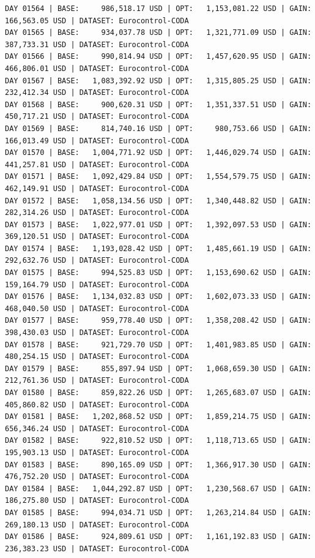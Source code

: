 \documentclass[11pt,a4paper]{article}
\begin{document}
\begin{verbatim}
DAY 01564 | BASE:     986,518.17 USD | OPT:   1,153,081.22 USD | GAIN: 166,563.05 USD | DATASET: Eurocontrol-CODA
DAY 01565 | BASE:     934,037.78 USD | OPT:   1,321,771.09 USD | GAIN: 387,733.31 USD | DATASET: Eurocontrol-CODA
DAY 01566 | BASE:     990,814.94 USD | OPT:   1,457,620.95 USD | GAIN: 466,806.01 USD | DATASET: Eurocontrol-CODA
DAY 01567 | BASE:   1,083,392.92 USD | OPT:   1,315,805.25 USD | GAIN: 232,412.34 USD | DATASET: Eurocontrol-CODA
DAY 01568 | BASE:     900,620.31 USD | OPT:   1,351,337.51 USD | GAIN: 450,717.21 USD | DATASET: Eurocontrol-CODA
DAY 01569 | BASE:     814,740.16 USD | OPT:     980,753.66 USD | GAIN: 166,013.49 USD | DATASET: Eurocontrol-CODA
DAY 01570 | BASE:   1,004,771.92 USD | OPT:   1,446,029.74 USD | GAIN: 441,257.81 USD | DATASET: Eurocontrol-CODA
DAY 01571 | BASE:   1,092,429.84 USD | OPT:   1,554,579.75 USD | GAIN: 462,149.91 USD | DATASET: Eurocontrol-CODA
DAY 01572 | BASE:   1,058,134.56 USD | OPT:   1,340,448.82 USD | GAIN: 282,314.26 USD | DATASET: Eurocontrol-CODA
DAY 01573 | BASE:   1,022,977.01 USD | OPT:   1,392,097.53 USD | GAIN: 369,120.51 USD | DATASET: Eurocontrol-CODA
DAY 01574 | BASE:   1,193,028.42 USD | OPT:   1,485,661.19 USD | GAIN: 292,632.76 USD | DATASET: Eurocontrol-CODA
DAY 01575 | BASE:     994,525.83 USD | OPT:   1,153,690.62 USD | GAIN: 159,164.79 USD | DATASET: Eurocontrol-CODA
DAY 01576 | BASE:   1,134,032.83 USD | OPT:   1,602,073.33 USD | GAIN: 468,040.50 USD | DATASET: Eurocontrol-CODA
DAY 01577 | BASE:     959,778.40 USD | OPT:   1,358,208.42 USD | GAIN: 398,430.03 USD | DATASET: Eurocontrol-CODA
DAY 01578 | BASE:     921,729.70 USD | OPT:   1,401,983.85 USD | GAIN: 480,254.15 USD | DATASET: Eurocontrol-CODA
DAY 01579 | BASE:     855,897.94 USD | OPT:   1,068,659.30 USD | GAIN: 212,761.36 USD | DATASET: Eurocontrol-CODA
DAY 01580 | BASE:     859,822.26 USD | OPT:   1,265,683.07 USD | GAIN: 405,860.82 USD | DATASET: Eurocontrol-CODA
DAY 01581 | BASE:   1,202,868.52 USD | OPT:   1,859,214.75 USD | GAIN: 656,346.24 USD | DATASET: Eurocontrol-CODA
DAY 01582 | BASE:     922,810.52 USD | OPT:   1,118,713.65 USD | GAIN: 195,903.13 USD | DATASET: Eurocontrol-CODA
DAY 01583 | BASE:     890,165.09 USD | OPT:   1,366,917.30 USD | GAIN: 476,752.20 USD | DATASET: Eurocontrol-CODA
DAY 01584 | BASE:   1,044,292.87 USD | OPT:   1,230,568.67 USD | GAIN: 186,275.80 USD | DATASET: Eurocontrol-CODA
DAY 01585 | BASE:     994,034.71 USD | OPT:   1,263,214.84 USD | GAIN: 269,180.13 USD | DATASET: Eurocontrol-CODA
DAY 01586 | BASE:     924,809.61 USD | OPT:   1,161,192.83 USD | GAIN: 236,383.23 USD | DATASET: Eurocontrol-CODA

\end{verbatim}
\end{document}
